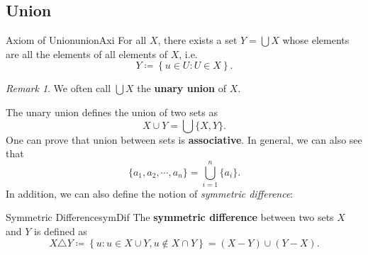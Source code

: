 \documentclass[math]{amznotes}
\theoremstyle{remark}
\newtheorem*{remark}{Remark}
\begin{document}
\subsection{Union}
\begin{axibox}{Axiom of Union}{unionAxi}
    For all $X$, there exists a set $Y = \bigcup X$ whose elements are all the elements of all elements of $X$, i.e.
    \begin{displaymath}
        Y \coloneqq \left\{u \in U \colon U \in X\right\}.
    \end{displaymath}
\end{axibox}
\begin{notebox}
    \begin{remark}
        We often call $\bigcup X$ the {\color{red} \textbf{unary union}} of $X$.
    \end{remark}
\end{notebox}
The unary union defines the union of two sets as 
\begin{equation*}
    X \cup Y = \bigcup\{X, Y\}.
\end{equation*}
One can prove that union between sets is \textbf{associative}. In general, we can also see that
\begin{equation*}
    \{a_1, a_2, \cdots, a_n\} = \bigcup_{i = 1}^n \{a_i\}.
\end{equation*}
In addition, we can also define the notion of \textit{symmetric difference}:
\begin{dfnbox}{Symmetric Difference}{symDif}
    The {\color{red} \textbf{symmetric difference}} between two sets $X$ and $Y$ is defined as 
    \begin{displaymath}
        X \triangle Y \coloneqq \left\{u \colon u \in X \cup Y, u \notin X \cap Y\right\} = (X - Y) \cup (Y - X).
    \end{displaymath}
\end{dfnbox}
\end{document}
